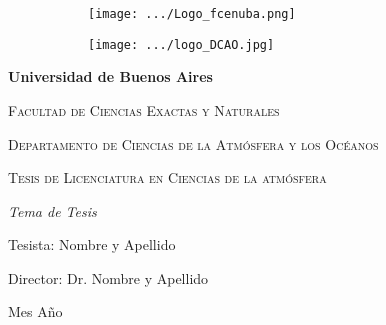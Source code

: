 \documentclass[12pt,a4paper]{article}
\begin{document}
	\begin{titlepage}

		\begin{figure}
			\centering
			\begin{subfigure}[b]{0.3\textwidth} 
			\texttt{[image: .../Logo\_fcenuba.png]}
			\end{subfigure}
			\hspace{50mm}
			\begin{subfigure}[b]{0.3\textwidth}
			\texttt{[image: .../logo\_DCAO.jpg]}
			\end{subfigure}
		\end{figure}
		\centering
		\vspace{5cm}
		{\bfseries\LARGE Universidad de Buenos Aires \par}
		{\scshape\Large Facultad de Ciencias Exactas y Naturales \par}
		{\scshape\Large Departamento de Ciencias de la Atmósfera y los Océanos \par}		
		\vspace{2cm}
		{\scshape\Large Tesis de Licenciatura en Ciencias de la atmósfera \par}
		\vspace{2cm}
		\raggedright
		{\itshape\Huge Tema de Tesis \par}
		\vfill
		{\Large Tesista: Nombre y Apellido \par}
		{\Large Director: Dr. Nombre y Apellido \par}
		\vfill
		{\Large Mes Año \par}
	\end{titlepage}
\end{document}
